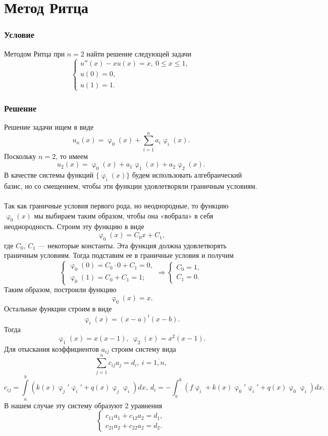\documentclass[a4paper, 12pt]{article}
\renewcommand{\leq}{\leqslant}
\renewcommand{\varphi}{\upvarphi}
\begin{document}
	\section*{Метод Ритца}
	\subsubsection*{Условие}
	Методом Ритца при $n=2$ найти решение следующей задачи
	$$\begin{cases}
		u''(x) - xu(x) = x,\ 0\leq x \leq 1,\\
		u(0) = 0,\\
		u(1) = 1.
	\end{cases}$$
	\subsubsection*{Решение}
	Решение задачи ищем в виде 
	$$u_n(x) = \varphi_0(x) + \sum_{i=1}^{n}a_i \varphi_i(x).$$
	Поскольку $n=2$, то имеем $$u_2(x) = \varphi_0(x) + a_1 \varphi_1(x) + a_2 \varphi_2(x).$$
	В качестве системы функций $\{\varphi_i(x)\}$ будем использовать алгебраический базис, но со смещением, чтобы эти функции удовлетворяли граничным условиям. \\\\
	Так как граничные условия первого рода, но неоднородные, то функцию $\varphi_0(x)$ мы выбираем таким образом, чтобы она «вобрала» в себя неоднородность. Строим эту функцию в виде $$\varphi_0(x) = C_0 x + C_1,$$ где $C_0$, $C_1$ --- некоторые константы. Эта функция должна удовлетворять граничным условиям. Тогда подставим ее в граничные условия и получим
	$$\begin{cases}
		\varphi_0(0) = C_0 \cdot 0 + C_1 = 0,\\
		\varphi_0(1) = C_0 + C_1 = 1;
	\end{cases}\Rightarrow \begin{cases}
	C_0 = 1,\\
	C_1 = 0.
	\end{cases}$$
	Таким образом, построили функцию $$\varphi_0(x) = x.$$
	Остальные функции строим в виде $$\varphi_i(x) = (x-a)^i (x-b).$$
	Тогда 
	$$\varphi_1(x) = x(x-1),\ \varphi_2(x) = x^2 (x-1).$$
	Для отыскания коэффициентов $a_{ij}$ строим систему вида 
	$$\sum_{j=1}^{n}c_{ij}a_j = d_i,\ i = \overline {1,n},$$
	$$c_{ij} = \int\limits_a^b (k(x)\varphi_j ' \varphi _i ' + q(x) \varphi_j \varphi_i)dx,\ d_i = -\int_a^b (f\varphi_i + k(x)\varphi_0' \varphi_i' + q(x)\varphi_0 \varphi_i)dx.$$
	В нашем случае эту систему образуют 2 уравнения
	$$\begin{cases}
		c_{11} a_1 + c_{12} a_2 = d_1,\\
		c_{21} a_2 + c_{22} a_2 = d_2.
	\end{cases}$$
\end{document}
